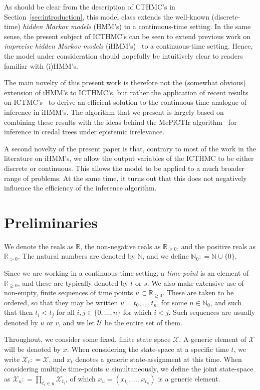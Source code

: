 \documentclass[twoside,11pt]{article}
\newcommand{\nats}{\mathbb{N}}
\newcommand{\natswith}{\nats_{0}}
\newcommand{\reals}{\mathbb{R}}
\newcommand{\realspos}{\reals_{>0}}
\newcommand{\realsnonneg}{\reals_{\geq 0}}
\newcommand{\states}{\mathcal{X}}
\newcommand{\coloneqq}{:\!=}
\begin{document}
As should be clear from the description of CTHMC's in Section~\ref{sec:introduction}, this model class extends the well-known (discrete-time) \emph{hidden Markov models} (HMM's) to a continuous-time setting. In the same sense, the present subject of ICTHMC's can be seen to extend previous work on \emph{imprecise hidden Markov models} (iHMM's)~\citep{deCooman:2010gd} to a continuous-time setting. Hence, the model  under consideration should hopefully be intuitively clear to readers familiar with (i)HMM's. 

The main novelty of this present work is therefore not the (somewhat obvious) extension of iHMM's to ICTHMC's, but rather the application of recent results on ICTMC's~\citep{krak2016ictmc} to derive an efficient solution to the continuous-time analogue of inference in iHMM's. The algorithm that we present is largely based on combining these results with the ideas behind the MePiCTIr algorithm~\citep{deCooman:2010gd} for inference in credal trees under epistemic irrelevance.

A second novelty of the present paper is that, contrary to most of the work in the literature on iHMM's, we allow the output variables of the ICTHMC to be either discrete or continuous. This allows the model to be applied to a much broader range of problems. At the same time, it turns out that this does not negatively influence the efficiency of the inference algorithm.

\section{Preliminaries}\label{sec:prelim}

We denote the reals as $\reals$, the non-negative reals as $\realsnonneg$, and the positive reals as $\realspos$. The natural numbers are denoted by $\nats$, and we define $\natswith\coloneqq\nats\cup\{0\}$.

Since we are working in a continuous-time setting, a \emph{time-point} is an element of $\realsnonneg$, and these are typically denoted by $t$ or $s$. We also make extensive use of non-empty, finite sequences of time points $u\subset\realsnonneg$. These are taken to be ordered, so that they may be written $u=t_0,\ldots,t_n$, for some $n\in\natswith$, and such that then $t_i<t_j$ for all $i,j\in\{0,\ldots,n\}$ for which $i< j$. Such sequences are usually denoted by $u$ or $v$, and we let $\mathcal{U}$ be the entire set of them.

Throughout, we consider some fixed, finite state space $\states$. A generic element of $\states$ will be denoted by $x$. When considering the state-space at a specific time $t$, we write $\states_t\coloneqq\states$, and $x_t$ denotes a generic state-assignment at this time. When considering multiple time-points $u$ simultaneously, we define the joint state-space as $\states_u\coloneqq\prod_{t_i\in u}\states_{t_i}$, of which $x_u=(x_{t_0},\ldots,x_{t_n})$ is a generic element.
\end{document}
